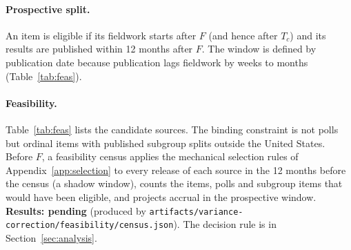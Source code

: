 \documentclass[11pt]{article}
\newcommand{\pending}[1]{\textbf{Results: pending} (produced by \nolinkurl{#1}).}
\begin{document}
\paragraph{Prospective split.} An item is eligible if its fieldwork starts after $F$ (and hence after $T_c$) and its results are published within 12 months after $F$. The window is defined by publication date because publication lags fieldwork by weeks to months (Table~\ref{tab:feas}).

\paragraph{Feasibility.} Table~\ref{tab:feas} lists the candidate sources. The binding constraint is not polls but ordinal items with published subgroup splits outside the United States. Before $F$, a feasibility census applies the mechanical selection rules of Appendix~\ref{app:selection} to every release of each source in the 12 months before the census (a shadow window), counts the items, polls and subgroup items that would have been eligible, and projects accrual in the prospective window. \pending{artifacts/variance-correction/feasibility/census.json} The decision rule is in Section~\ref{sec:analysis}.
\end{document}
